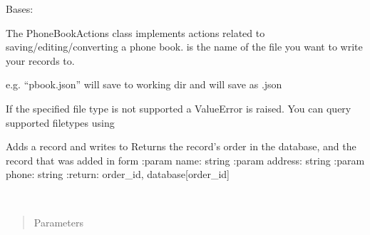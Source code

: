 \documentclass[letterpaper,10pt,english]{sphinxmanual}
\begin{document}
\begin{fulllineitems}
\label{\detokenize{phonebook:phonebook.phonebook_actions.PhoneBookActions}}
Bases: 

The PhoneBookActions class implements actions related to saving/editing/converting a phone book.
 is the name of the file you want to write your records to.

e.g. “pbook.json” will save to working dir and will save as .json

If the specified file type is not supported a ValueError is raised.
You can query supported filetypes using {\hyperref[\detokenize{phonebook:phonebook.phonebook_actions.PhoneBookActions.query_filetypes}]{}}

\begin{fulllineitems}
\label{\detokenize{phonebook:phonebook.phonebook_actions.PhoneBookActions.add_record}}
Adds a record and writes to {\hyperref[\detokenize{phonebook:phonebook.phonebook_actions.PhoneBookActions.file}]{}}
Returns the record’s order in the database, and the record that was added in  form
:param name: string
:param address: string
:param phone: string
:return: order\_id, database{[}order\_id{]}

\end{fulllineitems}


\begin{fulllineitems}
\label{\detokenize{phonebook:phonebook.phonebook_actions.PhoneBookActions.convert_records}}~\begin{quote}\begin{description}
\item[{Parameters}] \leavevmode
{} \textendash{} 


\end{description}
\end{quote}
\end{fulllineitems}
\end{fulllineitems}
\end{document}
